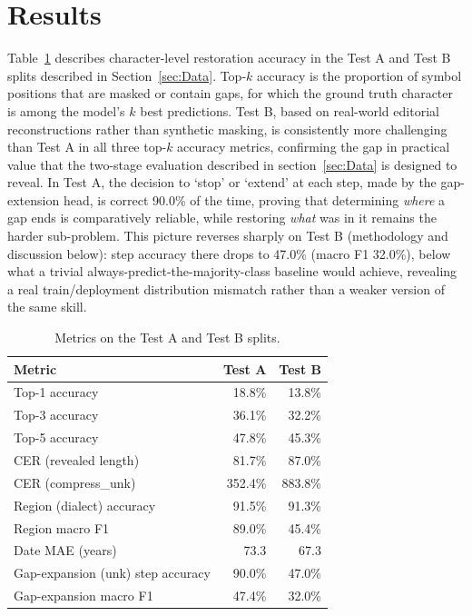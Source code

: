 \documentclass{article}
\begin{document}
\section{Results}

Table~\ref{tab:testab} describes character-level restoration accuracy in the Test A and Test B splits described in Section~\ref{sec:Data}. Top-$k$ accuracy is the proportion of symbol positions that are masked or contain gaps, for which the ground truth character is among  the model’s $k$ best predictions. Test B, based on real-world editorial reconstructions rather than synthetic masking, is consistently more challenging than Test A in all three top-$k$ accuracy metrics, confirming the gap in practical value that the two-stage evaluation described in section~\ref{sec:Data} is designed to reveal. In Test A, the decision to `stop' or `extend' at each step, made by the gap-extension head, is correct 90.0\% of the time, proving that determining \emph{where} a gap ends is comparatively reliable, while restoring \emph{what} was in it remains the harder sub-problem. This picture reverses sharply on Test B (methodology and discussion below): step accuracy there drops to 47.0\% (macro F1 32.0\%), below what a trivial always-predict-the-majority-class baseline would achieve, revealing a real train/deployment distribution mismatch rather than a weaker version of the same skill.

\begin{table}[H]
\centering
\begin{tabular}{|l|r|r|}
\hline
Metric & Test A & Test B \\
\hline
Top-1 accuracy & 18.8\% & 13.8\% \\
Top-3 accuracy & 36.1\% & 32.2\% \\
Top-5 accuracy & 47.8\% & 45.3\% \\
CER (revealed length) & 81.7\% & 87.0\% \\
CER (compress\_unk) & 352.4\% & 883.8\% \\
Region (dialect) accuracy & 91.5\% & 91.3\% \\
Region macro F1 & 89.0\% & 45.4\% \\
Date MAE (years) & 73.3 & 67.3 \\
Gap-expansion (unk) step accuracy & 90.0\% & 47.0\% \\
Gap-expansion macro F1 & 47.4\% & 32.0\% \\
\hline
\end{tabular}
\caption{Metrics on the Test A and Test B splits.}
\label{tab:testab}
\end{table}
\end{document}
